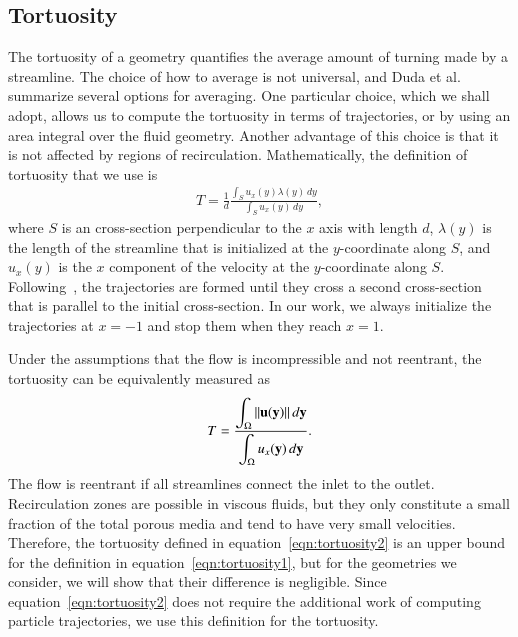 \documentclass[preprint, 10pt]{elsarticle}
\begin{document}
\subsection{Tortuosity}
The tortuosity of a geometry quantifies the average amount of turning
made by a streamline.  The choice of how to average is not universal,
and Duda et al.~\cite{dud-koz-mat2011} summarize several options for
averaging.  One particular choice, which we shall adopt, allows us to
compute the tortuosity in terms of trajectories, or by using an area
integral over the fluid geometry.  Another advantage of this choice is
that it is not affected by regions of recirculation.  Mathematically,
the definition of tortuosity that we use is
\begin{align}
  T = \frac{1}{d}\frac{\displaystyle\int_{S}u_x(y)\lambda(y)\,dy}
  {\displaystyle\int_{S}u_x(y)\,dy},
  \label{eqn:tortuosity1}
\end{align}
where $S$ is an cross-section perpendicular to the $x$ axis with length
$d$, $\lambda(y)$ is the length of the streamline that is initialized
at the $y$-coordinate along $S$, and $u_x(y)$ is the $x$ component of
the velocity at the $y$-coordinate along $S$.
Following~\cite{dud-koz-mat2011}, the trajectories are formed until they
cross a second cross-section that is parallel to the initial
cross-section.  In our work, we always initialize the trajectories at
$x=-1$ and stop them when they reach $x=1$.

Under the assumptions that the flow is incompressible and not reentrant,
the tortuosity can be equivalently measured as~\cite{dud-koz-mat2011}
\begin{align}
  T = \frac{\displaystyle\int_\Omega \|{\mathbf{u}}({\mathbf{y}})\|\, d{\mathbf{y}}}
           {\displaystyle\int_\Omega u_x({\mathbf{y}})\, d{\mathbf{y}}}.
  \label{eqn:tortuosity2}
\end{align}
The flow is reentrant if all streamlines connect the inlet to the
outlet.  Recirculation zones are possible in viscous fluids, but they
only constitute a small fraction of the total porous media and tend to
have very small velocities.  Therefore, the tortuosity defined in
equation~\eqref{eqn:tortuosity2} is an upper bound for the definition in
equation~\eqref{eqn:tortuosity1}, but for the geometries we consider, we
will show that their difference is negligible.  Since
equation~\eqref{eqn:tortuosity2} does not require the additional work of
computing particle trajectories, we use this definition for the
tortuosity.
\end{document}
